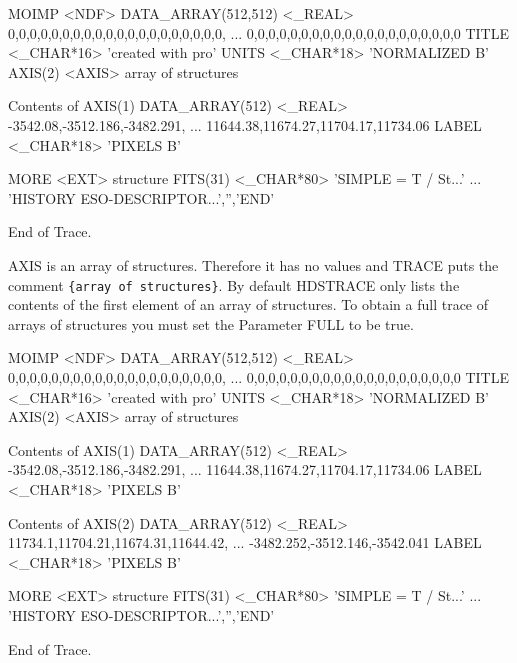 \documentclass[11pt,nolof]{starlink}
\begin{document}
\small
\begin{terminalv}

MOIMP  <NDF>
  DATA_ARRAY(512,512)  <_REAL>   0,0,0,0,0,0,0,0,0,0,0,0,0,0,0,0,0,0,0,0,
                                 ... 0,0,0,0,0,0,0,0,0,0,0,0,0,0,0,0,0,0,0,0
  TITLE          <_CHAR*16>      'created with pro'
  UNITS          <_CHAR*18>      'NORMALIZED       B'
  AXIS(2)        <AXIS>          {array of structures}

  Contents of AXIS(1)
     DATA_ARRAY(512)  <_REAL>       -3542.08,-3512.186,-3482.291,
                                    ... 11644.38,11674.27,11704.17,11734.06
     LABEL          <_CHAR*18>      'PIXELS           B'

  MORE           <EXT>           {structure}
     FITS(31)       <_CHAR*80>      'SIMPLE  =                    T / St...'
                                    ... 'HISTORY  ESO-DESCRIPTOR...','','END'

End of Trace.
\end{terminalv}
\normalsize
AXIS is an array of structures.  Therefore it has no values and
{\footnotesize TRACE} puts the comment \texttt{\{array of structures\}}.
By default {\footnotesize HDSTRACE} only lists the contents of the first
element of an array of structures.  To obtain a full trace of arrays of
structures you must set the Parameter FULL to be true.

\small
\begin{terminalv}

MOIMP  <NDF>
  DATA_ARRAY(512,512)  <_REAL>   0,0,0,0,0,0,0,0,0,0,0,0,0,0,0,0,0,0,0,0,
                                 ... 0,0,0,0,0,0,0,0,0,0,0,0,0,0,0,0,0,0,0,0
  TITLE          <_CHAR*16>      'created with pro'
  UNITS          <_CHAR*18>      'NORMALIZED       B'
  AXIS(2)        <AXIS>          {array of structures}

  Contents of AXIS(1)
     DATA_ARRAY(512)  <_REAL>       -3542.08,-3512.186,-3482.291,
                                    ... 11644.38,11674.27,11704.17,11734.06
     LABEL          <_CHAR*18>      'PIXELS           B'

  Contents of AXIS(2)
     DATA_ARRAY(512)  <_REAL>       11734.1,11704.21,11674.31,11644.42,
                                    ... -3482.252,-3512.146,-3542.041
     LABEL          <_CHAR*18>      'PIXELS           B'

  MORE           <EXT>           {structure}
     FITS(31)       <_CHAR*80>      'SIMPLE  =                    T / St...'
                                    ... 'HISTORY  ESO-DESCRIPTOR...','','END'

End of Trace.
\end{terminalv}
\normalsize
\end{document}
